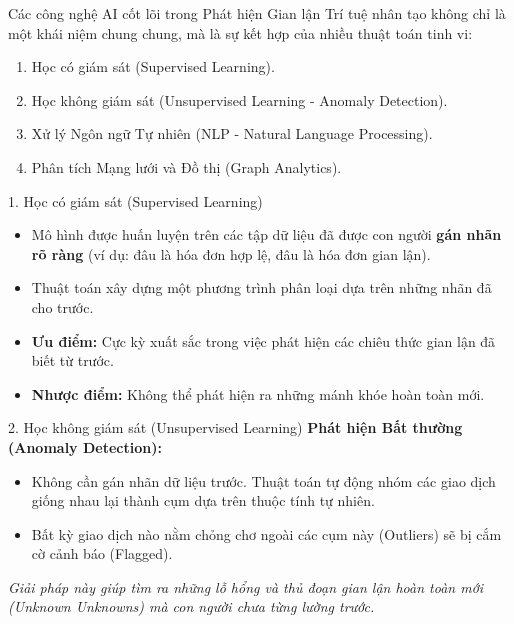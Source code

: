 \documentclass[aspectratio=169]{beamer}
\begin{document}
\begin{frame}{Các công nghệ AI cốt lõi trong Phát hiện Gian lận}
    Trí tuệ nhân tạo không chỉ là một khái niệm chung chung, mà là sự kết hợp của nhiều thuật toán tinh vi:
    \begin{enumerate}
        \item Học có giám sát (Supervised Learning).
        \item Học không giám sát (Unsupervised Learning - Anomaly Detection).
        \item Xử lý Ngôn ngữ Tự nhiên (NLP - Natural Language Processing).
        \item Phân tích Mạng lưới và Đồ thị (Graph Analytics).
    \end{enumerate}
\end{frame}

\begin{frame}{1. Học có giám sát (Supervised Learning)}
    \begin{itemize}
        \item Mô hình được huấn luyện trên các tập dữ liệu đã được con người \textbf{gán nhãn rõ ràng} (ví dụ: đâu là hóa đơn hợp lệ, đâu là hóa đơn gian lận).
        \item Thuật toán xây dựng một phương trình phân loại dựa trên những nhãn đã cho trước.
        \item \textbf{Ưu điểm:} Cực kỳ xuất sắc trong việc phát hiện các chiêu thức gian lận đã biết từ trước.
        \item \textbf{Nhược điểm:} Không thể phát hiện ra những mánh khóe hoàn toàn mới.
    \end{itemize}
\end{frame}

\begin{frame}{2. Học không giám sát (Unsupervised Learning)}
    \textbf{Phát hiện Bất thường (Anomaly Detection):}
    \begin{itemize}
        \item Không cần gán nhãn dữ liệu trước. Thuật toán tự động nhóm các giao dịch giống nhau lại thành cụm dựa trên thuộc tính tự nhiên.
        \item Bất kỳ giao dịch nào nằm chỏng chơ ngoài các cụm này (Outliers) sẽ bị cắm cờ cảnh báo (Flagged).
    \end{itemize}
    \vspace{0.3cm}
    \textit{Giải pháp này giúp tìm ra những lỗ hổng và thủ đoạn gian lận hoàn toàn mới (Unknown Unknowns) mà con người chưa từng lường trước.}
\end{frame}
\end{document}
